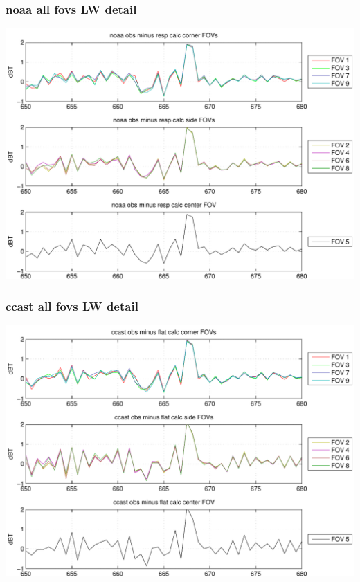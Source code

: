 \documentclass[11pt]{beamer}
\begin{document}
\begin{frame}
\frametitle{noaa all fovs LW detail}
\begin{center}
  \includegraphics[scale=0.5]{figures/cal_noaa_LW.pdf}
\end{center}
\end{frame}
\begin{frame}
\frametitle{ccast all fovs LW detail}
\begin{center}
  \includegraphics[scale=0.5]{figures/cal_ccast_LW.pdf}
\end{center}
\end{frame}
\end{document}
